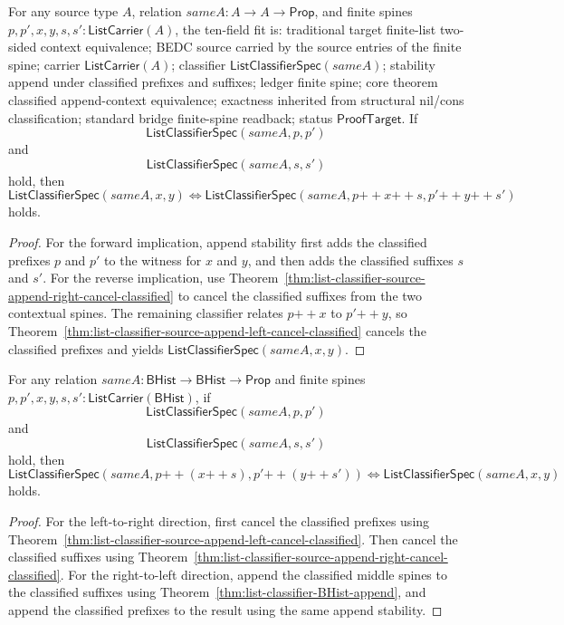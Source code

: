 \begin{theorem}
\label{thm:list-classifier-source-append-context-equiv}
For any source type $A$, relation $sameA:A\to A\to\mathsf{Prop}$, and finite
spines $p,p',x,y,s,s':\mathsf{ListCarrier}(A)$, the ten-field fit is:
traditional target finite-list two-sided context equivalence; BEDC source
carried by the source entries of the finite spine; carrier
$\mathsf{ListCarrier}(A)$; classifier $\mathsf{ListClassifierSpec}(sameA)$;
stability append under classified prefixes and suffixes; ledger finite spine;
core theorem classified append-context equivalence; exactness inherited from
structural nil/cons classification; standard bridge finite-spine readback;
status $\mathsf{ProofTarget}$. If
$$
\mathsf{ListClassifierSpec}(sameA,p,p')
$$
and
$$
\mathsf{ListClassifierSpec}(sameA,s,s')
$$
hold, then
$$
\mathsf{ListClassifierSpec}(sameA,x,y)
\Longleftrightarrow
\mathsf{ListClassifierSpec}(sameA,p{++}x{++}s,p'{++}y{++}s')
$$
holds.
\end{theorem}
\begin{proof}
For the forward implication, append stability first adds the classified
prefixes $p$ and $p'$ to the witness for $x$ and $y$, and then adds the
classified suffixes $s$ and $s'$. For the reverse implication, use
Theorem~\ref{thm:list-classifier-source-append-right-cancel-classified} to
cancel the classified suffixes from the two contextual spines. The remaining
classifier relates $p{++}x$ to $p'{++}y$, so
Theorem~\ref{thm:list-classifier-source-append-left-cancel-classified} cancels
the classified prefixes and yields $\mathsf{ListClassifierSpec}(sameA,x,y)$.
\end{proof}

\begin{theorem}
\label{thm:list-classifier-BHist-append-context-iff}
For any relation $sameA:\mathsf{BHist}\to\mathsf{BHist}\to\mathsf{Prop}$ and
finite spines $p,p',x,y,s,s':\mathsf{ListCarrier}(\mathsf{BHist})$, if
$$
\mathsf{ListClassifierSpec}(sameA,p,p')
$$
and
$$
\mathsf{ListClassifierSpec}(sameA,s,s')
$$
hold, then
$$
\mathsf{ListClassifierSpec}(sameA,p{++}(x{++}s),p'{++}(y{++}s'))
\Longleftrightarrow
\mathsf{ListClassifierSpec}(sameA,x,y)
$$
holds.
\end{theorem}
\begin{proof}
For the left-to-right direction, first cancel the classified prefixes using
Theorem~\ref{thm:list-classifier-source-append-left-cancel-classified}. Then
cancel the classified suffixes using
Theorem~\ref{thm:list-classifier-source-append-right-cancel-classified}. For
the right-to-left direction, append the classified middle spines to the
classified suffixes using Theorem~\ref{thm:list-classifier-BHist-append}, and
append the classified prefixes to the result using the same append stability.
\end{proof}


